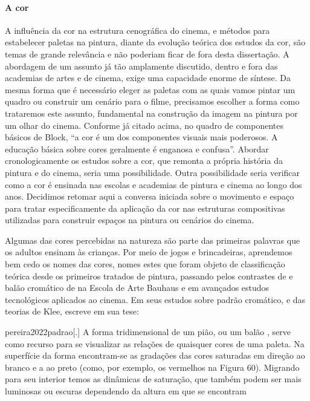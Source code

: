 \paragraph{A cor} A influência da cor na estrutura cenográfica do cinema, e métodos para
estabelecer paletas na pintura, diante da evolução teórica dos estudos
da cor, são temas de grande relevância e não poderiam ficar de fora
desta dissertação. A abordagem de um assunto já tão amplamente
discutido, dentro e fora das academias de artes e de cinema, exige uma
capacidade enorme de síntese. Da mesma forma que é necessário eleger as
paletas com as quais vamos pintar um quadro ou construir um cenário
para o filme, precisamos escolher a forma como trataremos este assunto,
fundamental na construção da imagem na pintura por um olhar do cinema.
Conforme já citado acima, no quadro de componentes básicos de Block,
\enquote{a cor é um dos componentes visuais mais poderosos. A educação
	básica sobre cores geralmente é enganosa e confusa}. Abordar
cronologicamente os estudos sobre a cor, que remonta a própria história
da pintura e do cinema, seria uma possibilidade. Outra possibilidade
seria verificar como a cor é ensinada nas escolas e academias de
pintura e cinema ao longo dos anos. Decidimos retomar aqui a conversa
iniciada sobre o movimento e espaço para tratar especificamente da
aplicação da cor nas estruturas compositivas utilizadas para construir
espaços na pintura ou cenários do cinema.

Algumas das cores percebidas na natureza são parte das primeiras
palavras que os adultos ensinam às crianças. Por meio de jogos e
brincadeiras, aprendemos bem cedo os nomes das cores, nomes estes que
foram objeto de classificação teórica desde os primeiros tratados de
pintura, passando pelos contrastes de \textcite{itten1975arte} e balão cromático de
\textcite{klee1971theorie} na Escola de Arte Bauhaus e em avançados estudos
tecnológicos aplicados ao cinema. Em seus estudos sobre padrão
cromático, e das teorias de Klee, \textcite{pereira2022padrao} escreve em sua tese:

\begin{displaycquote}[60-61]{pereira2022padrao}[.]
	A forma tridimensional de um pião, ou um balão \textelp{}, serve como recurso
	para se visualizar as relações de quaisquer cores de uma paleta. Na
	superfície da forma encontram-se as gradações das cores saturadas em
	direção ao branco e a ao preto (como, por exemplo, os vermelhos na
	Figura 60). Migrando para seu interior temos as dinâmicas de saturação,
	que também podem ser mais luminosas ou escuras dependendo da altura em
	que se encontram
\end{displaycquote}

